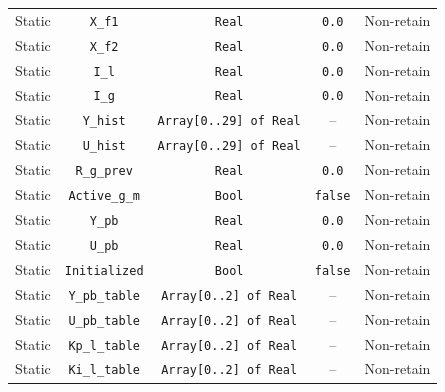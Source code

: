 \begin{table}[!p]
{\begin{tabular}{c c c c c}
    Static & \texttt{X\_f1} & \texttt{Real} & \texttt{0.0} & Non-retain \\ %
    Static & \texttt{X\_f2} & \texttt{Real} & \texttt{0.0} & Non-retain \\ %
    Static & \texttt{I\_l} & \texttt{Real} & \texttt{0.0} & Non-retain \\ %
    Static & \texttt{I\_g} & \texttt{Real} & \texttt{0.0} & Non-retain \\ %
    Static & \texttt{Y\_hist} & \texttt{Array[0..29] of Real} & -- & Non-retain \\ %
    Static & \texttt{U\_hist} & \texttt{Array[0..29] of Real} & -- & Non-retain \\ %
    Static & \texttt{R\_g\_prev} & \texttt{Real} & \texttt{0.0} & Non-retain \\ %
    Static & \texttt{Active\_g\_m} & \texttt{Bool} & \texttt{false} & Non-retain \\ %
    Static & \texttt{Y\_pb} & \texttt{Real} & \texttt{0.0} & Non-retain \\ %
    Static & \texttt{U\_pb} & \texttt{Real} & \texttt{0.0} & Non-retain \\ %
    Static & \texttt{Initialized} & \texttt{Bool} & \texttt{false} & Non-retain \\ %
    Static & \texttt{Y\_pb\_table} & \texttt{Array[0..2] of Real} & -- & Non-retain \\ %
    Static & \texttt{U\_pb\_table} & \texttt{Array[0..2] of Real} & -- & Non-retain \\ %
    Static & \texttt{Kp\_l\_table} & \texttt{Array[0..2] of Real} & -- & Non-retain \\ %
    Static & \texttt{Ki\_l\_table} & \texttt{Array[0..2] of Real} & -- & Non-retain \\ %


\end{tabular}}
\end{table}
